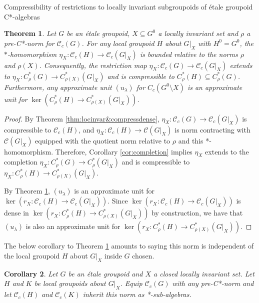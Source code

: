 \documentclass[a4paper, 12pt]{amsart}
\newtheorem{thm}{Theorem}[section]
\newtheorem{cor}[thm]{Corollary}
\theoremstyle{definition}
\theoremstyle{remark}
\numberwithin{equation}{section}
\begin{document}
\begin{section}{Compressibility of restrictions to locally invariant subgroupoids of \'etale groupoid C*-algebras}
\begin{thm}
    \label{thm:locinvar&compress}
     Let $G$ be an \'etale groupoid, $X\subseteq G^{0}$ a locally invariant set and $\rho$ a pre-C*-norm for $\mathscr{C}_{c}(G)$. For any local groupoid $H$ about $G|_{X}$ with $H^{0} = G^{0}$, the $*$-homomorphism $\eta_{X}:\mathscr{C}_{c}(H)\to \mathscr{C}_{c}(G|_{X})$ is bounded relative to the norms $\rho$ and $\rho(X)$. Consequently, the restriction map $\eta_{X}:\mathscr{C}_{c}(G)\to \mathscr{C}_{c}(G|_{X})$ extends to $\eta_{X}:C^{*}_{\rho}(G)\to C^{*}_{\rho(X)}(G|_{X})$ and is compressible to $C^{*}_{\rho}(H)\subseteq C^{*}_{\rho}(G)$. Furthermore, any approximate unit $(u_{\lambda})$ for $C_{c}(G^{0}\setminus X)$ is an approximate unit for $\ker(C^{*}_{\rho}(H)\to C^{*}_{\rho(X)}(G|_{X}))$.
\end{thm}

\begin{proof}
    By Theorem \ref{thm:locinvar&compressdense}, $\eta_{X}:\mathscr{C}_{c}(G)\to \mathscr{C}_{c}(G|_{X})$ is compressible to $\mathscr{C}_{c}(H)$, and $\eta_{X}:\mathscr{C}_{c}(H)\to \mathscr{C}(G|_{X})$ is norm contracting with $\mathscr{C}(G|_{X})$ equipped with the quotient norm relative to $\rho$ and this *-homomorphism. Therefore, Corollary \ref{cor:completion} implies $\eta_{X}$ extends to the completion $\eta_{X}:C^{*}_{\rho}(G)\to C^{*}_{\rho}(G|_{X})$ and is compressible to $\eta_{X}:C^{*}_{\rho}(H)\to C^{*}_{\rho(X)}(G|_{X})$.

    By Theorem \ref{thm:locinvar&compress}, $(u_{\lambda})$ is an approximate unit for $\ker(r_{X}:\mathscr{C}_{c}(H)\to \mathscr{C}_{c}(G|_{X}))$. Since $\ker(r_{X}:\mathscr{C}_{c}(H)\to \mathscr{C}_{c}(G|_{X}))$ is dense in $\ker(r_{X}:C^{*}_{\rho}(H)\to C^{*}_{\rho(X)}(G|_{X}))$ by construction, we have that $(u_{\lambda})$ is also an approximate unit for $\ker(r_{X}:C^{*}_{\rho}(H)\to C^{*}_{\rho(X)}(G|_{X}))$.
\end{proof}

The below corollary to Theorem \ref{thm:locinvar&compress} amounts to saying this norm is independent of the local groupoid $H$ about $G|_{X}$ inside $G$ chosen.

\begin{cor}
\label{cor:restrictnorm}
Let $G$ be an \'etale groupoid and $X$ a closed locally invariant set. Let $H$ and $K$ be local groupoids about $G|_{X}$. Equip $\mathscr{C}_{c}(G)$ with any pre-C*-norm and let $\mathscr{C}_{c}(H)$ and $\mathscr{C}_{c}(K)$ inherit this norm as *-sub-algebras.
 

\end{cor}
\end{section}
\end{document}
